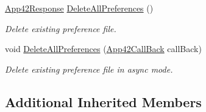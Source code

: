 \begin{DoxyCompactItemize}
\hyperlink{classcom_1_1shephertz_1_1app42_1_1paas_1_1sdk_1_1csharp_1_1_app42_response}{App42\+Response} \hyperlink{classcom_1_1shephertz_1_1app42_1_1paas_1_1sdk_1_1csharp_1_1recommend_1_1_recommender_service_afa3df0a82ea8620a849a82182344be21}{Delete\+All\+Preferences} ()
\begin{DoxyCompactList}\small\item\em Delete existing preference file. \end{DoxyCompactList}\item 
void \hyperlink{classcom_1_1shephertz_1_1app42_1_1paas_1_1sdk_1_1csharp_1_1recommend_1_1_recommender_service_a0ea93559566728a3f5b705bfaed04ac9}{Delete\+All\+Preferences} (\hyperlink{interfacecom_1_1shephertz_1_1app42_1_1paas_1_1sdk_1_1csharp_1_1_app42_call_back}{App42\+Call\+Back} call\+Back)
\begin{DoxyCompactList}\small\item\em Delete existing preference file in async mode. \end{DoxyCompactList}\end{DoxyCompactItemize}
\subsection*{Additional Inherited Members}



